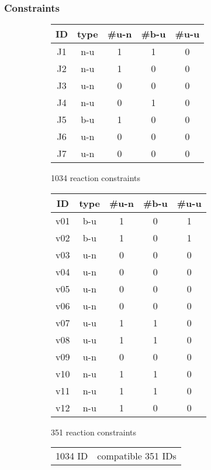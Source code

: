 \documentclass{article}
\begin{document}
\subsubsection{Constraints}


\begin{figure}
\centering
\begin{subfigure}{0.4\textwidth}
\begin{tabular}{|c|c|c|c|c|}
\hline
ID & type & \#u-n & \#b-u & \#u-u \\
\hline\hline
J1 & n-u & 1 & 1 & 0 \\
J2 & n-u & 1 & 0 & 0 \\
J3 & u-n & 0 & 0 & 0 \\
J4 & n-u & 0 & 1 & 0 \\
J5 & b-u & 1 & 0 & 0 \\
J6 & u-n & 0 & 0 & 0 \\
J7 & u-n & 0 & 0 & 0 \\
\hline
\end{tabular}
\caption{1034 reaction constraints}
\end{subfigure}
\hfill
\begin{subfigure}{0.5\textwidth}
\begin{tabular}{|c|c|c|c|c|}
\hline
ID & type & \#u-n & \#b-u & \#u-u \\
\hline\hline
v01 & b-u & 1 & 0 & 1 \\
v02 & b-u & 1 & 0 & 1 \\
v03 & u-n & 0 & 0 & 0 \\
v04 & u-n & 0 & 0 & 0 \\
v05 & u-n & 0 & 0 & 0 \\
v06 & u-n & 0 & 0 & 0 \\
v07 & u-u & 1 & 1 & 0 \\
v08 & u-u & 1 & 1 & 0 \\
v09 & u-n & 0 & 0 & 0 \\
v10 & n-u & 1 & 1 & 0 \\
v11 & n-u & 1 & 1 & 0 \\
v12 & n-u & 1 & 0 & 0 \\
\hline
\end{tabular}
\caption{351 reaction constraints}
\end{subfigure}
\hfill
\begin{subfigure}{0.4\textwidth}
\vspace{20pt}
\begin{tabular}{|c|l|}
\hline
1034 ID & compatible 351 IDs \\

\end{tabular}
\end{subfigure}
\end{figure}
\end{document}
